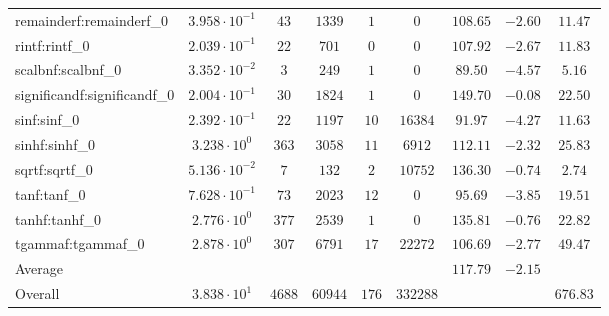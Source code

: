 \begin{tabular}{|l|c|c|c|c|c|c|c|c|}
remainderf:remainderf\_0     & $ 3.958 \cdot 10^{-1} $ & $ 43     $ & $ 1339  $ & $ 1   $ & $ 0      $ & $ 108.65      $ & $ -2.60   $ & $ 11.47   $ \\
rintf:rintf\_0               & $ 2.039 \cdot 10^{-1} $ & $ 22     $ & $ 701   $ & $ 0   $ & $ 0      $ & $ 107.92      $ & $ -2.67   $ & $ 11.83   $ \\
scalbnf:scalbnf\_0           & $ 3.352 \cdot 10^{-2} $ & $ 3      $ & $ 249   $ & $ 1   $ & $ 0      $ & $ 89.50       $ & $ -4.57   $ & $ 5.16    $ \\
significandf:significandf\_0 & $ 2.004 \cdot 10^{-1} $ & $ 30     $ & $ 1824  $ & $ 1   $ & $ 0      $ & $ 149.70      $ & $ -0.08   $ & $ 22.50   $ \\
sinf:sinf\_0                 & $ 2.392 \cdot 10^{-1} $ & $ 22     $ & $ 1197  $ & $ 10  $ & $ 16384  $ & $ 91.97       $ & $ -4.27   $ & $ 11.63   $ \\
sinhf:sinhf\_0               & $ 3.238 \cdot 10^{0}  $ & $ 363    $ & $ 3058  $ & $ 11  $ & $ 6912   $ & $ 112.11      $ & $ -2.32   $ & $ 25.83   $ \\
sqrtf:sqrtf\_0               & $ 5.136 \cdot 10^{-2} $ & $ 7      $ & $ 132   $ & $ 2   $ & $ 10752  $ & $ 136.30      $ & $ -0.74   $ & $ 2.74    $ \\
tanf:tanf\_0                 & $ 7.628 \cdot 10^{-1} $ & $ 73     $ & $ 2023  $ & $ 12  $ & $ 0      $ & $ 95.69       $ & $ -3.85   $ & $ 19.51   $ \\
tanhf:tanhf\_0               & $ 2.776 \cdot 10^{0}  $ & $ 377    $ & $ 2539  $ & $ 1   $ & $ 0      $ & $ 135.81      $ & $ -0.76   $ & $ 22.82   $ \\
tgammaf:tgammaf\_0           & $ 2.878 \cdot 10^{0}  $ & $ 307    $ & $ 6791  $ & $ 17  $ & $ 22272  $ & $ 106.69      $ & $ -2.77   $ & $ 49.47   $ \\
\hline
Average                      & $                     $ & $        $ & $       $ & $     $ & $        $ & $ 117.79      $ & $ -2.15   $ & $         $ \\
\hline
Overall                      & $ 3.838 \cdot 10^{1}  $ & $ 4688   $ & $ 60944 $ & $ 176 $ & $ 332288 $ & $             $ & $         $ & $ 676.83  $ \\
\hline
\end{tabular}
